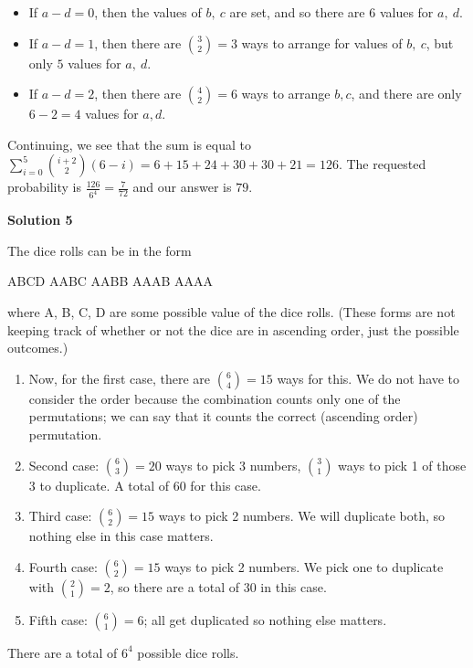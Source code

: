 \begin{enumerate}
 
            \begin{itemize}
        \item If $a - d = 0$, then the values of $b,\ c$ are set, and so there are $6$ values for $a,\ d$.
        \item If $a - d = 1$, then there are ${3\choose2} = 3$ ways to arrange for values of $b,\ c$, but only $5$ values for $a,\ d$.
        \item If $a - d = 2$, then there are ${4\choose2} = 6$ ways to arrange $b, c$, and there are only $6 - 2 = 4$ values for $a, d$.
            \end{itemize}
            Continuing, we see that the sum is equal to $\sum_{i = 0}^{5}{i+2\choose2}(6 - i) = 6 + 15 + 24 + 30 + 30 + 21 = 126$. The requested probability is $\frac{126}{6^4} = \frac{7}{72}$ and our answer is $\boxed{79}$.

 



\textbf{Solution 5}

The dice rolls can be in the form 

 ABCD
AABC
AABB
AAAB
AAAA

 where A, B, C, D are some possible value of the dice rolls. (These forms are not keeping track of whether or not the dice are in ascending order, just the possible outcomes.) 

 
            \begin{enumerate}
        \item Now, for the first case, there are ${6\choose4} = 15$ ways for this. We do not have to consider the order because the combination counts only one of the permutations; we can say that it counts the correct (ascending order) permutation.
        \item Second case: ${6\choose3} = 20$ ways to pick 3 numbers, ${3\choose1}$ ways to pick 1 of those 3 to duplicate. A total of 60 for this case.
        \item Third case: ${6\choose2}=15$ ways to pick 2 numbers. We will duplicate both, so nothing else in this case matters.
        \item Fourth case: ${6\choose2} = 15$ ways to pick 2 numbers. We pick one to duplicate with ${2\choose1} = 2$, so there are a total of 30 in this case.
        \item Fifth case: ${6\choose1} = 6$; all get duplicated so nothing else matters.
            \end{enumerate}
            There are a total of $6^4$ possible dice rolls. 


\end{enumerate}
